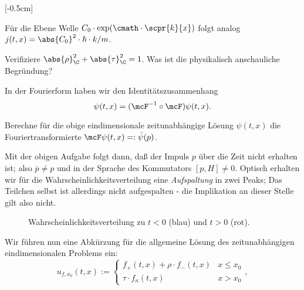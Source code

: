 \documentclass{subfiles}
\begin{document}
    [-0.5cm]

    Für die Ebene Welle $C_0\cdot\text{exp}(\cmath \cdot\scpr{k}{x})$ folgt analog $j(t,x) = \abs{C_0}^2\cdot \hbar\cdot k / m$. 
    \begin{Aufgabe}
        \nr{} Verifiziere $\abs{\rho}_\C^2 + \abs{\tau}_\C^2 = 1$. Was ist die physikalisch anschauliche Begründung?
    \end{Aufgabe}
    In der Fourierform haben wir den Identitätszusammenhang
    \[\psi(t,x) = (\mcF^{-1}\circ\mcF)\psi(t,x).\]
    \begin{Aufgabe}
        \nr{} Berechne für die obige eindimensionale zeitunabhängige Lösung $\psi(t,x)$ die Fouriertransformierte $\mcF\psi(t,x)=:\hat\psi(p)$. 
    \end{Aufgabe}
    Mit der obigen Aufgabe folgt dann, daß der Impuls $p$ über die Zeit nicht erhalten ist; also $\overline p\neq p$ und in der Sprache des Kommutators $[p,H]\neq 0$. Optisch erhalten wir für die Wahrscheinlichkeitsverteilung eine \emph{Aufspaltung} in zwei Peaks; Das Teilchen selbst ist allerdings nicht aufgespalten - die Implikation an dieser Stelle gilt also nicht. 
    \begin{figure}[H]
        \centering
        \caption{Wahrscheinlichkeitsverteilung zu $t<0$ (blau) und $t>0$ (rot).}
    \end{figure}
    Wir führen nun eine Abkürzung für die allgemeine Lösung des zeitunabhängigen eindimensionalen Problems ein:
    \[u_{f,x_0}(t,x):=\begin{cases}
        f_+(t,x) + \rho\cdot f_-(t,x) & x\leq x_0 \\
        \tau\cdot f_\kappa(t,x) & x>x_0
    \end{cases},\]
\end{document}
